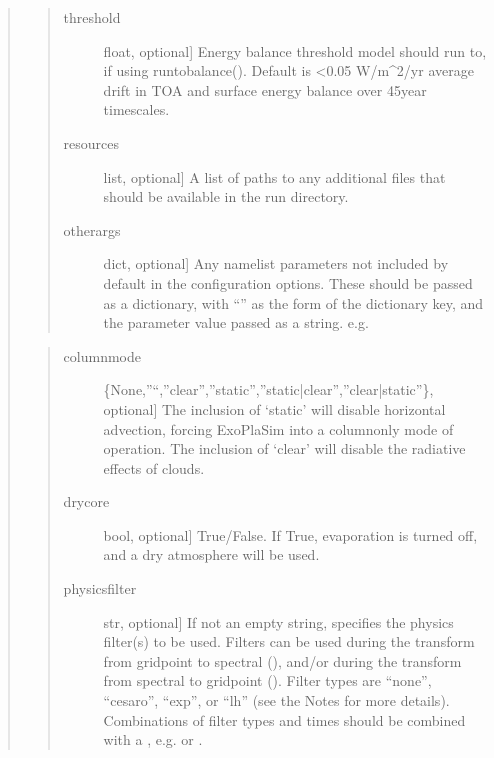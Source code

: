 \documentclass[letterpaper,10pt,english]{sphinxmanual}
\begin{document}
\begin{fulllineitems}
\begin{fulllineitems}
\begin{quote}
\begin{quote}
\begin{description}
\begin{quote}
\begin{description}
\end{description}
\end{quote}

\item[{threshold}] \leavevmode{[}float, optional{]}
Energy balance threshold model should run to, if using runtobalance().
Default is \textless{}0.05 W/m\textasciicircum{}2/yr average drift in TOA and surface energy balance
over 45\sphinxhyphen{}year timescales.

\item[{resources}] \leavevmode{[}list, optional{]}
A list of paths to any additional files that should be available in the
run directory.

\item[{otherargs}] \leavevmode{[}dict, optional{]}
Any namelist parameters not included by default in the configuration options.
These should be passed as a dictionary, with “” as the
form of the dictionary key, and the parameter value passed as a string.
e.g. 

\end{description}
\end{quote}

\begin{quote}
\begin{description}
\item[{columnmode}] \leavevmode{[}\{None,”\sphinxhyphen{}“,”clear”,”static”,”static|clear”,”clear|static”\}, optional{]}
The inclusion of ‘static’ will disable horizontal advection, forcing ExoPlaSim
into a column\sphinxhyphen{}only mode of operation. The inclusion of ‘clear’ will disable
the radiative effects of clouds.

\item[{drycore}] \leavevmode{[}bool, optional{]}
True/False. If True, evaporation is turned off, and a dry atmosphere will
be used.

\item[{physicsfilter}] \leavevmode{[}str, optional{]}
If not an empty string, specifies the physics filter(s) to be used. Filters
can be used during the transform from gridpoint to spectral (), and/or
during the transform from spectral to gridpoint (). Filter types are
“none”, “cesaro”, “exp”, or “lh” (see the Notes for more details).
Combinations of filter types and times should be combined with a \sphinxcode{\sphinxupquote{|}},
e.g.  or .


\end{description}
\end{quote}
\end{quote}
\end{fulllineitems}
\end{fulllineitems}
\end{document}
